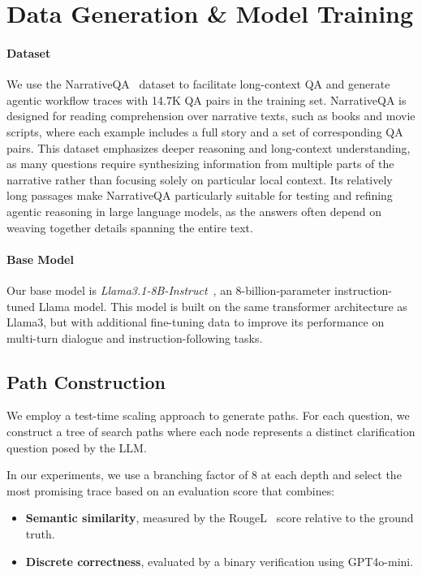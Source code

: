 \section{Data Generation \& Model Training}

\paragraph{Dataset} 
We use the NarrativeQA~\cite{kocisky-etal-2018-narrativeqa} dataset to facilitate long-context QA and generate agentic workflow traces with 14.7K QA pairs in the training set. NarrativeQA is designed for reading comprehension over narrative texts, such as books and movie scripts, where each example includes a full story and a set of corresponding QA pairs. This dataset emphasizes deeper reasoning and long-context understanding, as many questions require synthesizing information from multiple parts of the narrative rather than focusing solely on particular local context. Its relatively long passages make NarrativeQA particularly suitable for testing and refining agentic reasoning in large language models, as the answers often depend on weaving together details spanning the entire text.

\paragraph{Base Model} Our base model is \textit{Llama3.1-8B-Instruct}~\cite{dubey2024llama3}, an 8-billion-parameter instruction-tuned Llama model. This model is built on the same transformer architecture as Llama3, but with additional fine-tuning data to improve its performance on multi-turn dialogue and instruction-following tasks.

\subsection{\coc Path Construction}
We employ a test-time scaling approach to generate \coc paths. For each question, we construct a tree of search paths where each node represents a distinct clarification question posed by the LLM.

In our experiments, we use a branching factor of 8 at each depth and select the most promising trace based on an evaluation score that combines:
\begin{itemize}
    \item \textbf{Semantic similarity}, measured by the RougeL~\cite{lin-2004-rouge} score relative to the ground truth.
    \item \textbf{Discrete correctness}, evaluated by a binary verification using GPT4o-mini.
\end{itemize}

